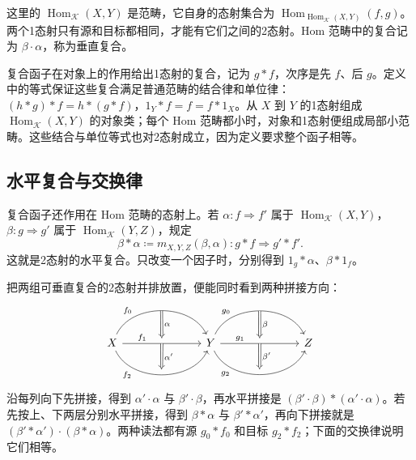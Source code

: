 这里的 \(\operatorname{Hom}_{\mathcal K}(X,Y)\) 是范畴，它自身的态射集合为 \(\operatorname{Hom}_{\operatorname{Hom}_{\mathcal K}(X,Y)}(f,g)\)。两个1态射只有源和目标都相同，才能有它们之间的2态射。Hom 范畴中的复合记为 \(\beta\cdot\alpha\)，称为垂直复合。

\ProseParagraphBreak

复合函子在对象上的作用给出1态射的复合，记为 \(g*f\)，次序是先 \(f\)、后 \(g\)。定义中的等式保证这些复合满足普通范畴的结合律和单位律：\((h*g)*f=h*(g*f)\)，\(1_Y*f=f=f*1_X\)。从 \(X\) 到 \(Y\) 的1态射组成 \(\operatorname{Hom}_{\mathcal K}(X,Y)\) 的对象类；每个 Hom 范畴都小时，对象和1态射便组成局部小范畴。这些结合与单位等式也对2态射成立，因为定义要求整个函子相等。

\subsection{水平复合与交换律}
\label{b4:subsec:F01:02}

复合函子还作用在 Hom 范畴的态射上。若 \(\alpha:f\Rightarrow f'\) 属于 \(\operatorname{Hom}_{\mathcal K}(X,Y)\)，\(\beta:g\Rightarrow g'\) 属于 \(\operatorname{Hom}_{\mathcal K}(Y,Z)\)，规定
\[
	\beta*\alpha\coloneqq m_{X,Y,Z}(\beta,\alpha): g*f\Longrightarrow g'*f'.
\]
这就是2态射的水平复合。只改变一个因子时，分别得到 \(1_g*\alpha\)、\(\beta*1_f\)。

\ProseParagraphBreak
把两组可垂直复合的2态射并排放置，便能同时看到两种拼接方向：
\[
	\begin{tikzcd}[column sep=7em]
		X\arrow[r,bend left=65,"f_0" near start,""{name=Fzero}] \arrow[r,"f_1" near start,""{name=Fone}] \arrow[r,bend right=65,"f_2"' near start,""{name=Ftwo}] &Y\arrow[r,bend left=65,"g_0" near start,""{name=Gzero}] \arrow[r,"g_1" near start,""{name=Gone}] \arrow[r,bend right=65,"g_2"' near start,""{name=Gtwo}]&Z \arrow[Rightarrow,from=Fzero,to=Fone,"\alpha"] \arrow[Rightarrow,from=Fone,to=Ftwo,"\alpha'"] \arrow[Rightarrow,from=Gzero,to=Gone,"\beta"] \arrow[Rightarrow,from=Gone,to=Gtwo,"\beta'"]
	\end{tikzcd}
\]
沿每列向下先拼接，得到 \(\alpha'\cdot\alpha\) 与 \(\beta'\cdot\beta\)，再水平拼接是 \((\beta'\cdot\beta)*(\alpha'\cdot\alpha)\)。若先按上、下两层分别水平拼接，得到 \(\beta*\alpha\) 与 \(\beta'*\alpha'\)，再向下拼接就是 \((\beta'*\alpha')\cdot(\beta*\alpha)\)。两种读法都有源 \(g_0*f_0\) 和目标 \(g_2*f_2\)；下面的交换律说明它们相等。

